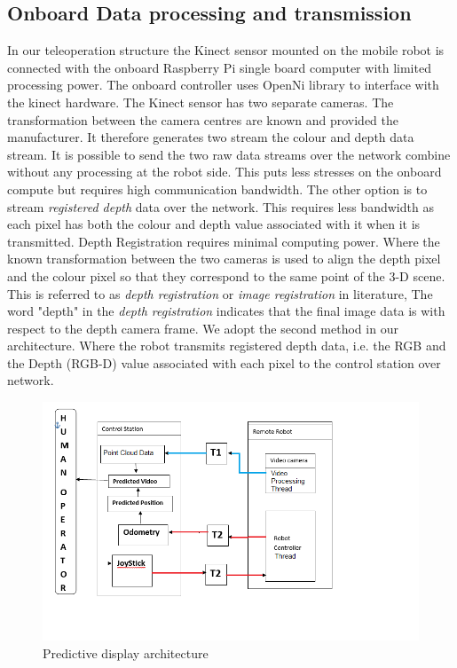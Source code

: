 \subsection{Onboard Data processing and transmission}
In our teleoperation structure the Kinect sensor mounted on the mobile robot is connected with the onboard Raspberry Pi single board computer with limited processing power. The onboard controller uses OpenNi library to interface with the kinect hardware.  The Kinect sensor has two separate cameras. The transformation between the camera centres are known and provided the manufacturer. It therefore generates two stream the colour and depth data stream. It is possible to send the two raw data streams over the network combine without any processing at the robot side. This  puts less stresses on the onboard compute but requires high communication bandwidth. The other option is to stream \textit{ registered depth} data over the network. This requires less bandwidth as each pixel has both the colour and depth value associated with it when it is transmitted. Depth Registration requires minimal computing power. Where the known transformation between the two cameras is used to align the depth pixel and the colour pixel so that they correspond to the same point of the 3-D scene. This is referred to as \textit{depth registration} or \textit{image registration} in literature, The word "depth" in the   \textit{depth registration} indicates  that the final image data is with respect to  the depth camera frame. We adopt the second method in our architecture. Where the robot transmits registered depth data, i.e. the RGB and the Depth (RGB-D) value associated with each pixel to the control station over network. 


\begin{figure}
	\includegraphics[width=1.2\linewidth,keepaspectratio]{Chapter7/fig/PredictorBlockDig}
	\caption{Predictive display architecture}	\label{fig:PDBLock}
\end{figure}

